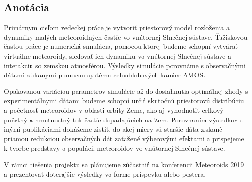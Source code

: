 \subsection{Anotácia}\label{anotuxe1cia}

Primárnym cieľom vedeckej práce je vytvoriť priestorový model rozloženia
a dynamiky malých meteoroidných častíc vo vnútornej Slnečnej sústave.
Ťažiskovou časťou práce je numerická simulácia, pomocou ktorej budeme
schopní vytvárať virtuálne meteoroidy, sledovať ich dynamiku vo
vnútornej Slnečnej sústave a interakciu so zemskou atmosférou. Výsledky
simulácie porovnáme s observačnými dátami získanými pomocou systému
celooblohových kamier AMOS.

Opakovanou variáciou parametrov simulácie až do dosiahnutia optimálnej
zhody s experimentálnymi dátami budeme schopní určiť skutočnú
priestorovú distribúciu a početnosť meteoroidov v oblasti orbity Zeme,
ako aj vyhodnotiť celkový početný a hmotnostný tok častíc dopadajúcich
na Zem. Porovnaním výsledkov s inými publikáciami dokážeme zistiť, do
akej miery sú staršie dáta získané priamou redukciou observačných dát
zaťažené výberovými efektami a prispejeme k tvorbe predstavy o populácii
meteoroidov vo vnútornej Slnečnej sústave.

V rámci riešenia projektu sa plánujeme zúčastniť na konferencii
Meteoroids 2019 a prezentovať doterajšie výsledky vo forme príspevku
alebo postera.
